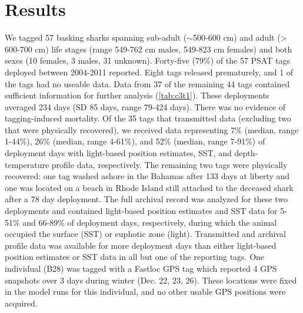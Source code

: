 \section{Results}
We tagged 57 basking sharks spanning sub-adult ($\sim$500-600 cm) and adult (> 600-700 cm) life stages (range 549-762 cm males, 549-823 cm females) and both sexes (10 females, 3 males, 31 unknown). Forty-five (79\%) of the 57 PSAT tags deployed between 2004-2011 reported. Eight tags released prematurely, and 1 of the tags had no useable data. Data from 37 of the remaining 44 tags contained sufficient information for further analysis (\cref{tab:c3t1}). These deployments averaged 234 days (SD 85 days, range 79-424 days). There was no evidence of tagging-induced mortality. Of the 35 tags that transmitted data (excluding two that were physically recovered), we received data representing 7\% (median, range 1-44\%), 26\% (median, range 4-61\%), and 52\% (median, range 7-91\%) of deployment days with light-based position estimates, SST, and depth-temperature profile data, respectively. The remaining two tags were physically recovered: one tag washed ashore in the Bahamas after 133 days at liberty and one was located on a beach in Rhode Island still attached to the deceased shark after a 78 day deployment. The full archival record was analyzed for these two deployments and contained light-based position estimates and SST data for 5-51\% and 66-89\% of deployment days, respectively, during which the animal occupied the surface (SST) or euphotic zone (light). Transmitted and archival profile data was available for more deployment days than either light-based position estimates or SST data in all but one of the reporting tags. One individual (B28) was tagged with a Fastloc GPS tag which reported 4 GPS snapshots over 3 days during winter (Dec. 22, 23, 26). These locations were fixed in the model runs for this individual, and no other usable GPS positions were acquired.

